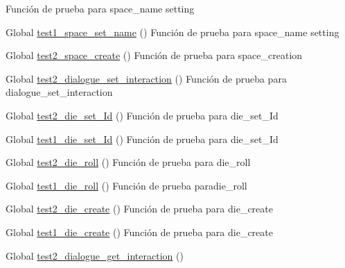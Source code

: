\begin{DoxyRefList}
%
Función de prueba para space\+\_\+name setting  
\item[Global \mbox{\hyperlink{space__test_8c_a2569bab6cfeec15f722d232bb8c78c9e}{test1\+\_\+space\+\_\+set\+\_\+name}} ()]\label{test__test000246}%
%
Función de prueba para space\+\_\+name setting  
\item[Global \mbox{\hyperlink{space__test_8c_a012cd3cf37a8d91e2d7098a264c29d65}{test2\+\_\+space\+\_\+create}} ()]\label{test__test000245}%
%
Función de prueba para space\+\_\+creation  
\item[Global \mbox{\hyperlink{dialogue__test_8c_a8b4afb860f412f96ea8e0dc4e645f2ac}{test2\+\_\+dialogue\+\_\+set\+\_\+interaction}} ()]\label{test__test000047}%
%
Función de prueba para dialogue\+\_\+set\+\_\+interaction  
\item[Global \mbox{\hyperlink{die__test_8c_aba25cb59703baaefe0072882b847925d}{test2\+\_\+die\+\_\+set\+\_\+\+Id}} ()]\label{test__test000056}%
%
Función de prueba para die\+\_\+set\+\_\+\+Id  
\item[Global \mbox{\hyperlink{die__test_8c_aca1dfa20f42a3a4360ac83b32284e11b}{test1\+\_\+die\+\_\+set\+\_\+\+Id}} ()]\label{test__test000055}%
%
Función de prueba para die\+\_\+set\+\_\+\+Id  
\item[Global \mbox{\hyperlink{die__test_8c_af7df60d905acf9505f1e434c6f75d027}{test2\+\_\+die\+\_\+roll}} ()]\label{test__test000054}%
%
Función de prueba para die\+\_\+roll  
\item[Global \mbox{\hyperlink{die__test_8c_ac005cb42fa33b38a79896934a5a50001}{test1\+\_\+die\+\_\+roll}} ()]\label{test__test000053}%
%
Función de prueba paradie\+\_\+roll  
\item[Global \mbox{\hyperlink{die__test_8c_a2508c1329b5002e3830945dd9ad7f726}{test2\+\_\+die\+\_\+create}} ()]\label{test__test000052}%
%
Función de prueba para die\+\_\+create  
\item[Global \mbox{\hyperlink{die__test_8c_ac0b610468bd3d3b358051c966b771431}{test1\+\_\+die\+\_\+create}} ()]\label{test__test000051}%
%
Función de prueba para die\+\_\+create  
\item[Global \mbox{\hyperlink{dialogue__test_8c_a23c69f07c0075b5353ab0be68466f54b}{test2\+\_\+dialogue\+\_\+get\+\_\+interaction}} ()]\label{test__test000050}%

\end{DoxyRefList}
